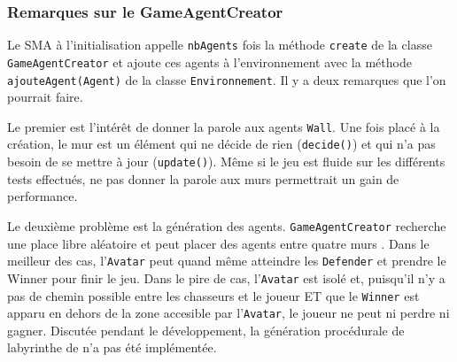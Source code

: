 \documentclass[a4paper]{article}
\begin{document}
\subsubsection{Remarques sur le GameAgentCreator}
Le SMA à l'initialisation appelle \texttt{nbAgents} fois la méthode \texttt{create} de la classe \texttt{GameAgentCreator} et ajoute ces agents à l'environnement avec la méthode \texttt{ajouteAgent(Agent)} de la classe \texttt{Environnement}. Il y a deux remarques que l'on pourrait faire.

\medskip
Le premier est l'intérêt de donner la parole aux agents \texttt{Wall}. Une fois placé à la création, le mur est un élément qui ne décide de rien (\texttt{decide()}) et qui n'a pas besoin de se mettre à jour (\texttt{update()}). Même si le jeu est fluide sur les différents tests effectués, ne pas donner la parole aux murs permettrait un gain de performance.

\medskip
Le deuxième problème est la génération des agents. \texttt{GameAgentCreator} recherche une place libre aléatoire et peut placer des agents \og entre quatre murs \fg{}. Dans le meilleur des cas, l'\texttt{Avatar} peut quand même atteindre les \texttt{Defender} et prendre le Winner pour finir le jeu.  Dans le pire de cas, l'\texttt{Avatar} est isolé et, puisqu'il n'y a pas de chemin possible entre les chasseurs et le joueur ET que le \texttt{Winner} est apparu en dehors de la zone accesible par l'\texttt{Avatar}, le joueur ne peut ni perdre ni gagner. Discutée pendant le développement, la génération procédurale de labyrinthe de n'a pas été implémentée.
\end{document}
